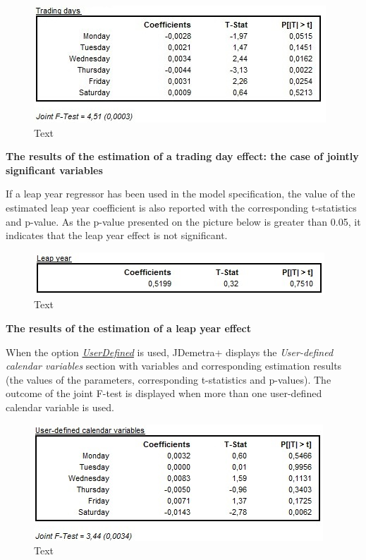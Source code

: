 \documentclass[
  letterpaper,
  DIV=11,
  numbers=noendperiod]{scrreprt}
\begin{document}
\begin{figure}

{\centering \includegraphics{./All_images/image30_RMSB.jpg}

}

\caption{Text}

\end{figure}

\textbf{The results of the estimation of a trading day effect: the case
of jointly significant variables}

If a leap year regressor has been used in the model specification, the
value of the estimated leap year coefficient is also reported with the
corresponding t-statistics and p-value. As the p-value presented on the
picture below is greater than 0.05, it indicates that the leap year
effect is not significant.

\begin{figure}

{\centering \includegraphics{./All_images/image31_RMSB.jpg}

}

\caption{Text}

\end{figure}

\textbf{The results of the estimation of a leap year effect}

When the option \protect\hyperlink{regression}{\emph{UserDefined}} is
used, JDemetra+ displays the \emph{User-defined calendar variables}
section with variables and corresponding estimation results (the values
of the parameters, corresponding t-statistics and p-values). The outcome
of the joint F-test is displayed when more than one user-defined
calendar variable is used.

\begin{figure}

{\centering \includegraphics{./All_images/image32_RMSB.jpg}

}

\caption{Text}

\end{figure}
\end{document}
